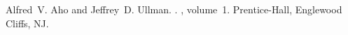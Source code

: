 \documentclass[11pt]{article}
\begin{document}
\begin{thebibliography}{}

Alfred~V. Aho and Jeffrey~D. Ullman.
.
, volume~1.
\newblock Prentice-{Hall}, Englewood Cliffs, NJ.
















\end{thebibliography}
\end{document}
